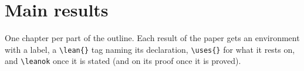 \chapter{Main results}
\label{chap:main}

One chapter per part of the outline. Each result of the paper gets an environment with a label,
a \verb|\lean{}| tag naming its declaration, \verb|\uses{}| for what it rests on, and
\verb|\leanok| once it is stated (and on its proof once it is proved).
